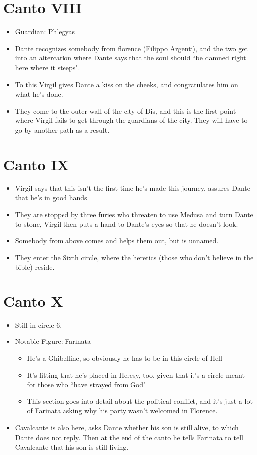 \documentclass[10pt]{article}
\begin{document}
	\section{Canto VIII}
	\begin{itemize}
		\item Guardian: Phlegyas
		\item Dante recognizes somebody from florence (Filippo Argenti), and the two get into an altercation where 
			Dante says that the soul should ``be damned right here where 
			it steeps". 
		\item To this Virgil gives Dante a kiss on the cheeks, and congratulates him on what he's done.
		\item They come to the outer wall of the city of Dis, and this is the first point where Virgil 
			fails to get through the guardians of the city. They will have to go 
			by another path as a result. 
	\end{itemize}
	\section{Canto IX}
	\begin{itemize}
		\item Virgil says that this isn't the first time he's made this journey, assures Dante that he's 
			in good hands
		\item They are stopped by three furies who threaten to use Medusa and turn Dante to stone, Virgil 
			then puts a hand to Dante's eyes so that he doesn't look.
		\item Somebody from above comes and helps them out, but is unnamed. 
		\item They enter the Sixth circle, where the heretics (those who don't believe in the 
			bible) reside. 
	\end{itemize}
	\section{Canto X}
	\begin{itemize}
		\item Still in circle 6.
		\item Notable Figure: Farinata
			\begin{itemize}
				\item He's a Ghibelline, so obviously he has to be in this circle of Hell
				\item It's fitting that he's placed in Heresy, too, given that it's a circle meant for 
					those who ``have strayed from God"
				\item This section goes into detail about the political conflict, and it's just a lot of 
					Farinata asking why his party wasn't welcomed in Florence.
			\end{itemize}
		\item Cavalcante is also here, asks Dante whether his son is still alive, to which Dante does not reply.
			Then at the end of the canto he tells Farinata to tell Cavalcante that his son is still living.  
	\end{itemize}
\end{document}
